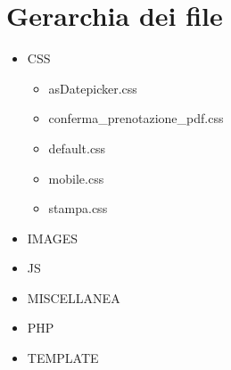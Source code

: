 \section{Gerarchia dei file}
	\begin{itemize}  
		\item CSS
		\begin{itemize}
			\item asDatepicker.css 
			\item conferma\_prenotazione\_pdf.css
			\item default.css
			\item mobile.css
			\item stampa.css			
		\end{itemize}
		\item IMAGES
		\item JS
		\item MISCELLANEA
		\item PHP
		\item TEMPLATE
		
	\end{itemize}
